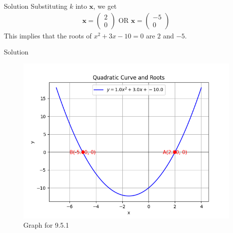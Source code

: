 \documentclass{beamer}
\let\vec\mathbf
\theoremstyle{remark}
\newcommand{\myvec}[1]{\ensuremath{\begin{pmatrix}#1\end{pmatrix}}}
\begin{document}
\begin{frame}{Solution}
Substituting $k$ into $\vec{x}$, we get
\begin{align}
    \vec{x} = \myvec{2 \\ 0} \text{ OR } \vec{x}=\myvec{-5 \\ 0}
\end{align}
This implies that the roots of $x^2 +3x -10 =0$ are $2$ and $-5$.
\end{frame}
\begin{frame}{Solution}
    \begin{figure}[H]
        \centering
        \includegraphics[width=0.5\columnwidth]{figs/1.png}
        \caption{Graph for 9.5.1}
        \label{fig:placeholder}
    \end{figure}
\end{frame}
\end{document}
